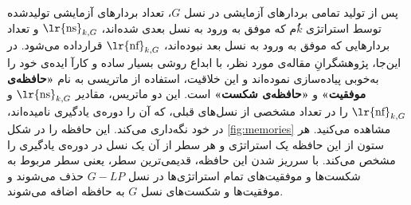 \documentclass[12pt,a4paper]{article}
\theoremstyle{definition}
\theoremstyle{theorem}
\theoremstyle{definition}
\begin{document}
%
پس از تولید تمامی بردارهای آزمایشی در نسل 
$\mathit{G}$،
تعداد بردارهای آزمایشی تولیدشده توسط استراتژی 
$k$ُم
که موفق به ورود به نسل بعدی شده‌اند، 
$\text{\lr{ns}}_{k,G}$
و تعداد بردارهایی که موفق به ورود به نسل بعد نبوده‌اند، 
$\text{\lr{nf}}_{k,G}$
قرارداده می‌شود. در این‌جا، پژوهشگرانِ مقاله‌ی مورد نظر، با ابداع روشی بسیار ساده و کارآ ایده‌ی خود را به‌خوبی پیاده‌سازی نموده‌اند و این خلاقیت، استفاده از ماتریسی به نام
{\bf{«حافظه‌ی موفقیت»}}
و
{\bf{«حافظه‌ی شکست»}}
است. این دو ماتریس، مقادیر 
$\text{\lr{ns}}_{k,G}$
و 
$\text{\lr{nf}}_{k,G}$
را در تعداد مشخصی از نسل‌های قبلی، که آن‌ را دوره‌ی یادگیری
نامیده‌اند، در خود نگه‌داری می‌کند. این حافظه را در شکل \ref{fig:memories} مشاهده می‌کنید. هر ستون از این حافظه یک استراتژی و هر سطر از آن یک نسل در دوره‌ی یادگیری را مشخص می‌کند. با سرریز شدن این حافظه، قدیمی‌ترین سطر، یعنی سطر مربوط به شکست‌ها و موفقیت‌های تمام استراتژی‌ها در نسل 
$\mathit{G} - \mathit{LP}$
حذف می‌شوند و موفقیت‌ها و شکست‌های نسل 
$\mathit{G}$
به حافظه اضافه می‌شوند.
\end{document}
